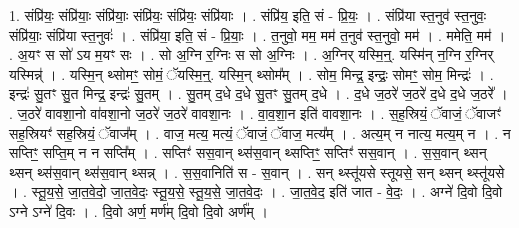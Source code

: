 \documentclass[17pt]{extarticle}
\begin{document}
1. संप्रि॑यः॒ संप्रि॑याः॒ संप्रि॑याः॒ संप्रि॑यः॒ संप्रि॑यः॒ संप्रि॑याः । . संप्रि॑य॒ इति॒ सं - प्रि॒यः॒ । . संप्रि॑या स्त॒नुव॑ स्त॒नुवः॒ संप्रि॑याः॒ संप्रि॑या स्त॒नुवः॑ । . संप्रि॑या॒ इति॒ सं - प्रि॒याः॒ । . त॒नुवो॒ मम॒ मम॑ त॒नुव॑ स्त॒नुवो॒ मम॑ । . ममेति॒ मम॑ । . अ॒यꣳ स सो॑ ऽय म॒यꣳ सः । . सो अ॒ग्नि र॒ग्निः स सो अ॒ग्निः । . अ॒ग्निर् यस्मि॒न्॒. यस्मि॑न् न॒ग्नि र॒ग्निर् यस्मिन्न्॑ । . यस्मि॒न् थ्सोमꣳ॒॒ सोमं॒ ॅयस्मि॒न्॒. यस्मि॒न् थ्सोम᳚म् । . सोम॒ मिन्द्र॒ इन्द्रः॒ सोमꣳ॒॒ सोम॒ मिन्द्रः॑ । . इन्द्रः॑ सु॒तꣳ सु॒त मिन्द्र॒ इन्द्रः॑ सु॒तम् । . सु॒तम् द॒धे द॒धे सु॒तꣳ सु॒तम् द॒धे । . द॒धे ज॒ठरे॑ ज॒ठरे॑ द॒धे द॒धे ज॒ठरे᳚ । . ज॒ठरे॑ वावशा॒नो वा॑वशा॒नो ज॒ठरे॑ ज॒ठरे॑ वावशा॒नः । . वा॒व॒शा॒न इति॑ वावशा॒नः । . स॒ह॒स्रियं॒ ॅवाजं॒ ॅवाजꣳ॑ सह॒स्रियꣳ॑ सह॒स्रियं॒ ॅवाज᳚म् । . वाज॒ मत्य॒ मत्यं॒ ॅवाजं॒ ॅवाज॒ मत्य᳚म् । . अत्य॒म् न नात्य॒ मत्य॒म् न । . न सप्तिꣳ॒॒ सप्ति॒म् न न सप्ति᳚म् । . सप्तिꣳ॑ सस॒वान् थ्स॑स॒वान् थ्सप्तिꣳ॒॒ सप्तिꣳ॑ सस॒वान् । . स॒स॒वान् थ्सन् थ्सन् थ्स॑स॒वान् थ्स॑स॒वान् थ्सन्न् । . स॒स॒वानिति॑ स - स॒वान् । . सन् थ्स्तू॑यसे स्तूयसे॒ सन् थ्सन् थ्स्तू॑यसे । . स्तू॒य॒से॒ जा॒त॒वे॒दो॒ जा॒त॒वे॒दः॒ स्तू॒य॒से॒ स्तू॒य॒से॒ जा॒त॒वे॒दः॒ । . जा॒त॒वे॒द॒ इति॑ जात - वे॒दः॒ । . अग्ने॑ दि॒वो दि॒वो ऽग्ने ऽग्ने॑ दि॒वः । . दि॒वो अर्ण॒ मर्ण॑म् दि॒वो दि॒वो अर्ण᳚म् । \newline
\end{document}
